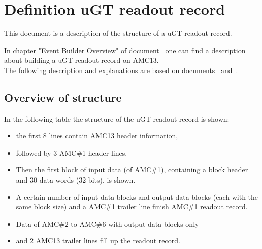 
% 

\section{Definition uGT readout record}

This document is a description of the structure of a uGT readout record.

In chapter "Event Builder Overview" of document~\cite{AMC13} one can find a description about building a uGT readout record on AMC13.\\
The following description and explanations are based on documents~\cite{AMC13} and~\cite{MP7}.

\subsection{Overview of structure}
\label{sec:overview}
In the following table the structure of the uGT readout record is shown:
\begin{itemize}
\item the first 8 lines contain AMC13 header information, 
\item followed by 3 AMC\#1 header lines.
\item Then the first block of input data (of AMC\#1), containing a block header and 30 data words (32 bits), is shown.
\item A certain number of input data blocks and output data blocks (each with the same block size) and a AMC\#1 trailer line finish AMC\#1 readout record.
\item Data of AMC\#2 to AMC\#6 with output data blocks only
\item and 2 AMC13 trailer lines fill up the readout record.
\end{itemize}

